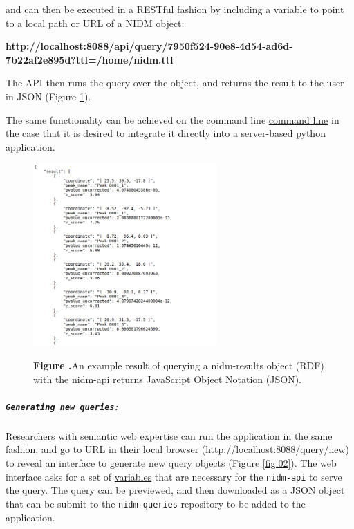 \documentclass[twocolumn]{bmcart}%
\begin{document}
and can then be executed in a RESTful fashion by including a variable to point to a local path or URL of a NIDM object:\newline

\textbf{http://localhost:8088/api/query/7950f524-90e8-4d54-ad6d-7b22af2e895d?ttl=/home/nidm.ttl}\newline

The API then runs the query over the object, and returns the result to the user in JSON (Figure \ref{fig:01}).

The same functionality can be achieved on the command line \href{http://nidm-api.readthedocs.org/en/latest/getting-started.html#integration-into-python}{command line} in the case that it is desired to integrate it directly into a server-based python application.

\begin{figure}[h!]
\begin{center}
\includegraphics[width=7cm]{img/figure1}
\end{center}
 \textbf{\label{fig:01}Figure .}{An example result of querying a nidm-results object (RDF) with the nidm-api returns JavaScript Object Notation (JSON).}
\end{figure}

\subparagraph{\texorpdfstring{\texttt{Generating new queries}:}{:}}\label{section}
Researchers with semantic web expertise can run the application in the same fashion, and go to URL in their local browser (http://localhost:8088/query/new) to reveal an interface to generate new query objects (Figure \ref{fig:02}). The web interface asks for a set of \href{http://nidm-api.readthedocs.org/en/latest/development.html#fields}{variables} that are necessary for the \texttt{nidm-api} to serve the query. The query can be previewed, and then downloaded as a JSON object that can be submit to the \texttt{nidm-queries} repository to be added to the application.\newline
\end{document}
